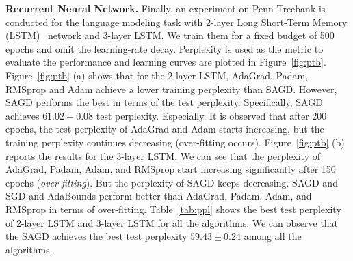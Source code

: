 \documentclass[11pt]{article}
\begin{document}
\begin{table}[t]
\small
\caption{ Test Perplexity of LSTMs on Penn Treebank. Bold number indicates the best result.}\label{tab:ppl}
\end{table}

\textbf{Recurrent Neural Network.}
Finally, an experiment on Penn Treebank is conducted for the language modeling task with 2-layer Long Short-Term Memory (LSTM)~\citep{stni2018} network and 3-layer LSTM. We train them for a fixed budget of 500 epochs and omit the learning-rate decay. Perplexity is used as the metric to evaluate the performance and learning curves are plotted in Figure~\ref{fig:ptb}. 
Figure~\ref{fig:ptb} (a) shows that for the 2-layer LSTM, AdaGrad, Padam, RMSprop and Adam achieve a lower training perplexity than \textsc{SAGD}. However, \textsc{SAGD} performs the best in terms of the test perplexity. Specifically, \textsc{SAGD} achieves $61.02 \pm 0.08$ test perplexity. 
Especially, It is observed that after 200 epochs, the test perplexity of AdaGrad and Adam starts increasing, but the training perplexity continues decreasing (over-fitting occurs).  
Figure~\ref{fig:ptb} (b) reports the results for the 3-layer LSTM. We can see that the perplexity of AdaGrad, Padam, Adam, and RMSprop start increasing significantly after 150 epochs (\emph{over-fitting}). But the perplexity of \textsc{SAGD} keeps decreasing. \textsc{SAGD} and SGD and AdaBounds perform better than AdaGrad, Padam, Adam, and RMSprop in terms of over-fitting.
Table~\ref{tab:ppl} shows the best test perplexity of 2-layer LSTM and 3-layer LSTM for all the algorithms. We can observe that the \textsc{SAGD} achieves the best test perplexity $59.43 \pm 0.24$ among all the algorithms. 
\end{document}
